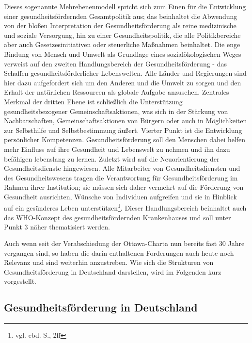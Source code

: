 Dieses sogenannte Mehrebenenmodell spricht sich zum Einen für die Entwicklung einer gesundheitsfördernden Gesamtpolitik aus; das beinhaltet die Abwendung von der bloßen Interpretation der Gesundheitsförderung als reine medizinische und soziale Versorgung, hin zu einer Gesundheitspolitik, die alle Politikbereiche aber auch Gesetzesinitiativen oder steuerliche Maßnahmen beinhaltet. Die enge Bindung von Mensch und Umwelt als Grundlage eines sozialökologischen Weges verweist auf den zweiten Handlungsbereich der Gesundheitsförderung - das Schaffen gesundheitsförderlicher Lebenswelten. Alle Länder und Regierungen sind hier dazu aufgefordert sich um den Anderen und die Umwelt zu sorgen und den Erhalt der natürlichen Ressourcen als globale Aufgabe anzusehen. Zentrales Merkmal der dritten Ebene ist schließlich die Unterstützung gesundheitsbezogener Gemeinschaftsaktionen, was sich in der Stärkung von Nachbarschaften, Gemeinschaftsaktionen von Bürgern oder auch in Möglichkeiten zur Selbsthilfe und Selbstbestimmung äußert. Vierter Punkt ist die Entwicklung persönlicher Kompetenzen. Gesundheitsförderung soll den Menschen dabei helfen mehr Einfluss auf ihre Gesundheit und Lebenswelt zu nehmen und ihn dazu befähigen lebenslang zu lernen. Zuletzt wird auf die Neuorientierung der Gesundheitsdienste hingewiesen. Alle Mitarbeiter von Gesundheitsdiensten und des Gesundheitswesens tragen die Verantwortung für Gesundheitsförderung im Rahmen ihrer Institution; sie müssen sich daher vermehrt auf die Förderung von Gesundheit ausrichten, Wünsche von Individuen aufgreifen und sie in Hinblick auf ein gesünderes Leben unterstützen\footnote{vgl. ebd. S., 2ff}. Dieser Handlungsbereich beinhaltet auch das WHO-Konzept des gesundheitsfördernden Krankenhauses und soll unter Punkt 3 näher thematisiert werden.

Auch wenn seit der Verabschiedung der Ottawa-Charta nun bereits fast 30 Jahre vergangen sind, so haben die darin enthaltenen Forderungen auch heute noch Relevanz und sind weiterhin anzustreben. Wie sich die Strukturen von Gesundheitsförderung in Deutschland darstellen, wird im Folgenden kurz vorgestellt.

\subsection{Gesundheitsförderung in Deutschland}
\label{sec:GesundheitsförderungInDeutschland}

